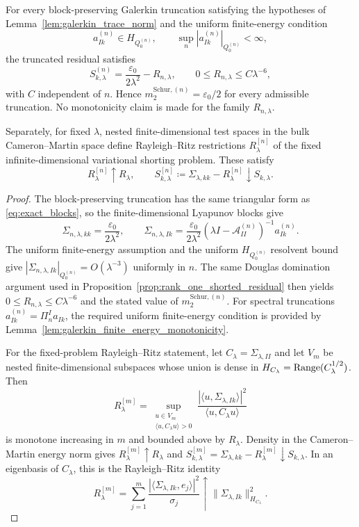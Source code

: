 \begin{lemma}
\label{lem:galerkin_variational_shorting}
For every block-preserving Galerkin truncation satisfying the hypotheses of
Lemma~\ref{lem:galerkin_trace_norm} and the uniform finite-energy condition
\[
  a_{Ik}^{(n)}\in H_{Q_0^{(n)}},
  \qquad
  \sup_n |a_{Ik}^{(n)}|_{Q_0^{(n)}}<\infty,
\]
the truncated residual satisfies
\[
  S_{k,\lambda}^{(n)}
  =
  \frac{\varepsilon_0}{2\lambda^2}-R_{n,\lambda},
  \qquad
  0\le R_{n,\lambda}\le C\lambda^{-6},
\]
with $C$ independent of $n$.  Hence
$m_2^{\mathrm{Schur},(n)}=\varepsilon_0/2$ for every admissible truncation.
No monotonicity claim is made for the family $R_{n,\lambda}$.

Separately, for fixed $\lambda$, nested finite-dimensional test spaces in the
bulk Cameron--Martin space define Rayleigh--Ritz restrictions
$R_\lambda^{[n]}$ of the fixed infinite-dimensional variational shorting
problem.  These satisfy
\[
  R_\lambda^{[n]}\uparrow R_\lambda,
  \qquad
  S_{k,\lambda}^{[n]}\coloneqq\Sigma_{\lambda,kk}-R_\lambda^{[n]}
  \downarrow S_{k,\lambda}.
\]
\end{lemma}

\begin{proof}
The block-preserving truncation has the same triangular form as
\eqref{eq:exact_blocks}, so the finite-dimensional Lyapunov blocks give
\[
  \Sigma_{n,\lambda,kk}=\frac{\varepsilon_0}{2\lambda^2},
  \qquad
  \Sigma_{n,\lambda,Ik}
  =
  \frac{\varepsilon_0}{2\lambda^2}
  (\lambda I-\mathcal{A}_{II}^{(n)})^{-1}a_{Ik}^{(n)}.
\]
The uniform finite-energy assumption and the uniform $H_{Q_0^{(n)}}$ resolvent
bound give
$|\Sigma_{n,\lambda,Ik}|_{Q_0^{(n)}}=O(\lambda^{-3})$ uniformly in $n$.
The same Douglas domination argument used in
Proposition~\ref{prop:rank_one_shorted_residual} then yields
$0\le R_{n,\lambda}\le C\lambda^{-6}$ and the stated value of
$m_2^{\mathrm{Schur},(n)}$.  For spectral truncations
$a_{Ik}^{(n)}=\Pi_n^I a_{Ik}$, the required uniform finite-energy condition is
provided by Lemma~\ref{lem:galerkin_finite_energy_monotonicity}.

For the fixed-problem Rayleigh--Ritz statement, let
$C_\lambda=\Sigma_{\lambda,II}$ and let $V_m$ be nested finite-dimensional
subspaces whose union is dense in $H_{C_\lambda}=\operatorname{Range}(C_\lambda^{1/2})$.
Then
\[
  R_\lambda^{[m]}
  =
  \sup_{\substack{u\in V_m\\ \langle u,C_\lambda u\rangle>0}}
  \frac{|\langle u,\Sigma_{\lambda,Ik}\rangle|^2}
       {\langle u,C_\lambda u\rangle}
\]
is monotone increasing in $m$ and bounded above by $R_\lambda$.  Density in the
Cameron--Martin energy norm gives $R_\lambda^{[m]}\uparrow R_\lambda$ and
$S_{k,\lambda}^{[m]}=\Sigma_{\lambda,kk}-R_\lambda^{[m]}\downarrow
S_{k,\lambda}$.  In an eigenbasis of $C_\lambda$, this is the Rayleigh--Ritz
identity
\[
  R_\lambda^{[m]}
  =
  \sum_{j=1}^m
  \frac{|\langle\Sigma_{\lambda,Ik},e_j\rangle|^2}{\sigma_j}
  \uparrow
  \|\Sigma_{\lambda,Ik}\|_{H_{C_\lambda}}^2.
\]
\end{proof}


